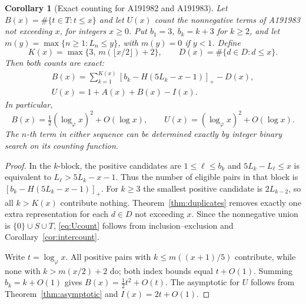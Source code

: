\documentclass[11pt]{article}
\newtheorem{corollary}[theorem]{Corollary}
\begin{document}
\begin{corollary}[Exact counting for A191982 and A191983]
\label{cor:union}
Let $B(x)=\#\{t\in T:t\le x\}$ and let $U(x)$ count the
nonnegative terms of A191983 not exceeding $x$, for
integers $x\ge0$. Put $b_1=3$, $b_k=k+3$ for $k\ge2$,
and let $m(y)=\max\{n\ge1:L_n\le y\}$, with $m(y)=0$ if
$y<1$. Define
\[
K(x)=\max\{3,\,m(\lfloor x/2\rfloor)+2\},\qquad
D(x)=\#\{d\in D:d\le x\}.
\]
Then both counts are exact:
\begin{align}
\boxed{\displaystyle
 B(x)=\sum_{k=1}^{K(x)}
 \left[b_k-H(5L_k-x-1)\right]_+-D(x),}
 \label{eq:Tcount}\\
\boxed{\displaystyle U(x)=1+A(x)+B(x)-I(x).}
\label{eq:Ucount}
\end{align}
In particular,
\[
B(x)=\tfrac12(\log_\varphi x)^2+O(\log x),\qquad
U(x)=(\log_\varphi x)^2+O(\log x).
\]
The $n$-th term in either sequence can be determined
exactly by integer binary search on its counting function.
\end{corollary}
\begin{proof}
In the $k$-block, the positive candidates are
$1\le\ell\le b_k$ and
$5L_k-L_\ell\le x$ is equivalent to
$L_\ell>5L_k-x-1$.
Thus the number of eligible pairs in that block is
$[b_k-H(5L_k-x-1)]_+$.
For $k\ge3$ the smallest positive candidate is $2L_{k-2}$,
so all $k>K(x)$ contribute nothing.
Theorem~\ref{thm:duplicates} removes exactly one
extra representation for each $d\in D$ not exceeding $x$.
Since the nonnegative union is $\{0\}\cup S\cup T$,
\eqref{eq:Ucount} follows from inclusion--exclusion and
Corollary~\ref{cor:intercount}.

Write $t=\log_\varphi x$.
All positive pairs with $k\le m((x+1)/5)$ contribute,
while none with $k>m(x/2)+2$ do; both index bounds equal
$t+O(1)$. Summing $b_k=k+O(1)$ gives
$B(x)=\frac12t^2+O(t)$.
The asymptotic for $U$ follows from
Theorem~\ref{thm:asymptotic} and
$I(x)=2t+O(1)$.
\end{proof}
\end{document}
